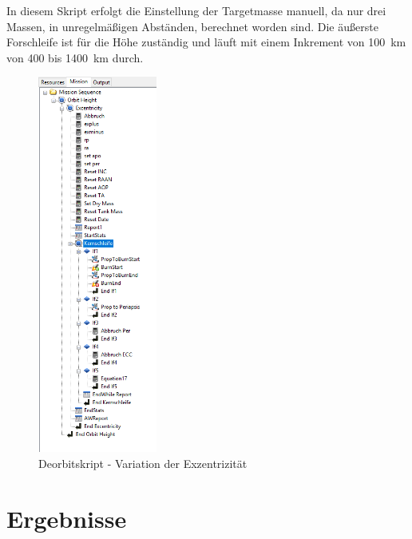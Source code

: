 	In diesem Skript erfolgt die Einstellung der Targetmasse manuell, da nur drei Massen, in unregelmäßigen Abständen, berechnet worden sind. Die äußerste Forschleife ist für die Höhe zuständig und läuft mit einem Inkrement von \SI{100}{\kilo\metre} von \num{400} bis \SI{1400}{\kilo\metre} durch. 
\begin{figure}[!h]
	\centering
		\includegraphics[width=0.35\textwidth]{graphics/GMAT/GMAT_Skript_ECC.PNG}
		\caption{Deorbitskript - Variation der Exzentrizität}
			\label{fig:GMAT_Skript_ECC}
\end{figure}





\section{Ergebnisse}

